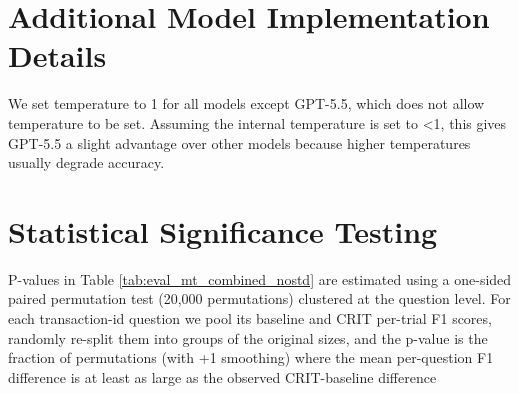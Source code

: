 \documentclass[11pt]{article}
\begin{document}
\section{Additional Model Implementation Details}

We set temperature to 1 for all models except GPT-5.5, which does not allow temperature to be set. Assuming the internal temperature is set to <1, this gives GPT-5.5 a slight advantage over other models because higher temperatures usually degrade accuracy.

\section{Statistical Significance Testing}

P-values in Table \ref{tab:eval_mt_combined_nostd} are estimated using a one-sided paired permutation test (20,000 permutations) clustered at the question level. For each transaction-id question we pool its baseline and CRIT per-trial F1 scores, randomly re-split them into groups of the original sizes, and the p-value is the fraction of permutations (with +1 smoothing) where the mean per-question F1 difference is at least as large as the observed CRIT-baseline difference 
\end{document}
